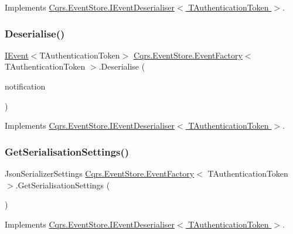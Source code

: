 Implements \hyperlink{interfaceCqrs_1_1EventStore_1_1IEventDeserialiser_ad84a4d975f6e2b5b1fef3fd23e738bfd_ad84a4d975f6e2b5b1fef3fd23e738bfd}{Cqrs.\+Event\+Store.\+I\+Event\+Deserialiser$<$ T\+Authentication\+Token $>$}.

\mbox{\label{classCqrs_1_1EventStore_1_1EventFactory_a1be7f3c4014991bc4b9619eaa2e8b9a4_a1be7f3c4014991bc4b9619eaa2e8b9a4}} 
\subsubsection{\texorpdfstring{Deserialise()}{Deserialise()}\hspace{0.1cm}{\footnotesize\ttfamily [2/2]}}
{\footnotesize\ttfamily \hyperlink{interfaceCqrs_1_1Events_1_1IEvent}{I\+Event}$<$T\+Authentication\+Token$>$ \hyperlink{classCqrs_1_1EventStore_1_1EventFactory}{Cqrs.\+Event\+Store.\+Event\+Factory}$<$ T\+Authentication\+Token $>$.Deserialise (\begin{DoxyParamCaption}\item[{Resolved\+Event}]{notification }\end{DoxyParamCaption})}



Implements \hyperlink{interfaceCqrs_1_1EventStore_1_1IEventDeserialiser_a931d4a498b2213aac492bd35518a3286_a931d4a498b2213aac492bd35518a3286}{Cqrs.\+Event\+Store.\+I\+Event\+Deserialiser$<$ T\+Authentication\+Token $>$}.

\mbox{\label{classCqrs_1_1EventStore_1_1EventFactory_a4e52c4fd639d1af97b1ecc5052189783_a4e52c4fd639d1af97b1ecc5052189783}} 
\subsubsection{\texorpdfstring{Get\+Serialisation\+Settings()}{GetSerialisationSettings()}}
{\footnotesize\ttfamily Json\+Serializer\+Settings \hyperlink{classCqrs_1_1EventStore_1_1EventFactory}{Cqrs.\+Event\+Store.\+Event\+Factory}$<$ T\+Authentication\+Token $>$.Get\+Serialisation\+Settings (\begin{DoxyParamCaption}{ }\end{DoxyParamCaption})}



Implements \hyperlink{interfaceCqrs_1_1EventStore_1_1IEventDeserialiser_aa2859d10fd556b743679079ac15ffdde_aa2859d10fd556b743679079ac15ffdde}{Cqrs.\+Event\+Store.\+I\+Event\+Deserialiser$<$ T\+Authentication\+Token $>$}.

